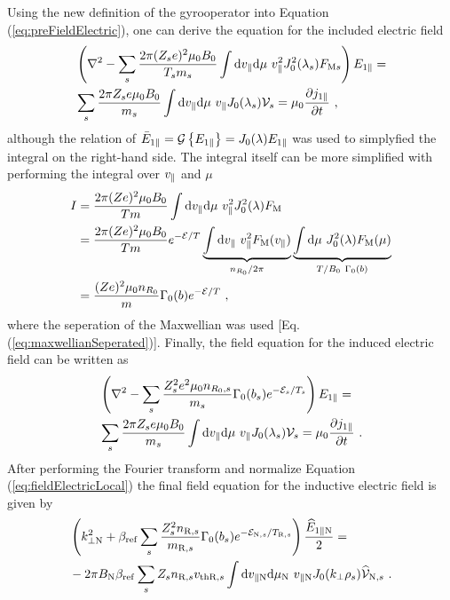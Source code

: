 Using the new definition of the gyrooperator into Equation (\ref{eq:preFieldElectric}), one can derive the equation for the included electric field 
\begin{gather}
    \begin{aligned}
        &\left(\nabla^2 - \sum_s \frac{2\pi (Z_se)^2 \mu_0 B_0}{T_sm_s}  \int \mathrm{d}v_\parallel\mathrm{d}\mu ~ v_\parallel^2 J_0^2(\lambda_s) F_{\mathrm{M}s} \right) E_{1\parallel} = \\
	    &\sum_s \frac{2\pi Z_se \mu_0 B_0}{m_s}  \int \mathrm{d}v_\parallel\mathrm{d}\mu ~ v_\parallel J_0(\lambda_s) \mathcal{V}_s = \mu_0 \frac{\partial j_{1\parallel}}{\partial t}~,
    \end{aligned}
	\label{eq:prefieldElectricLocal}
\end{gather}
although the relation of $\bar{E}_{1\parallel} = \mathcal{G} \left\{E_{1\parallel}\right\} = J_0(\lambda) E_{1\parallel}$ was used to simplyfied the integral on the right-hand side. The integral itself can be more simplified with performing the integral over $v_\parallel$ and $\mu$
\begin{gather}
	\begin{aligned}
		I &= \frac{2\pi (Ze)^2 \mu_0 B_0}{Tm}  \int \mathrm{d}v_\parallel\mathrm{d}\mu ~ v_\parallel^2 J_0^2(\lambda) F_\mathrm{M} \\
		  &= \frac{2\pi (Ze)^2 \mu_0 B_0}{Tm} e^{-\mathcal{E}/T} \underbrace{\int \mathrm{d}v_\parallel ~ v_\parallel^2 F_\mathrm{M}(v_\parallel)}_{n_{R_0}/2\pi} \underbrace{\int \mathrm{d}\mu ~ J_0^2(\lambda) F_\mathrm{M}(\mu)}_{T/B_0~\Gamma_0(b)} \\
		  &= \frac{(Ze)^2 \mu_0 n_{R_0}}{m} \Gamma_0(b) e^{-\mathcal{E}/T} ~,
	\end{aligned}
\end{gather}
where the seperation of the Maxwellian was used [Eq. (\ref{eq:maxwellianSeperated})]. Finally, the field equation for the induced electric field can be written as
\begin{gather}
    \begin{aligned}
        &\left(\nabla^2 - \sum_s \frac{Z_s^2e^2 \mu_0 n_{R_0,s}}{m_s} \Gamma_0(b_s) e^{-\mathcal{E}_s/T_s} \right) E_{1\parallel} = \\
	    &\sum_s \frac{2\pi Z_se \mu_0 B_0}{m_s}  \int \mathrm{d}v_\parallel\mathrm{d}\mu ~ v_\parallel J_0(\lambda_s) \mathcal{V}_s = \mu_0 \frac{\partial j_{1\parallel}}{\partial t}~.
    \end{aligned}
	\label{eq:fieldElectricLocal}
\end{gather}
After performing the Fourier transform and normalize Equation (\ref{eq:fieldElectricLocal}) the final field equation for the inductive electric field is given by
\begin{gather}
    \begin{aligned}
        &\left(k_{\perp \mathrm{N}}^2 + \beta_\mathrm{ref} \sum_s \frac{Z^2_sn_{\mathrm{R},s}}{m_{\mathrm{R},s}} \Gamma_0(b_s) e^{-\mathcal{E}_{\mathrm{N},s}/T_{\mathrm{R},s}} \right) \frac{\widehat{E}_{1\parallel \mathrm{N}}}{2} = \\
        &- 2\pi B_\mathrm{N} \beta_\mathrm{ref} \sum_s Z_s n_{\mathrm{R},s} v_{\mathrm{th}\mathrm{R},s} \int \mathrm{d}v_{\parallel \mathrm{N}} \mathrm{d}\mu_\mathrm{N} ~ v_{\parallel \mathrm{N}} J_0(k_\perp \rho_s) \widehat{\mathcal{V}}_{\mathrm{N},s} ~.
    \end{aligned}
    \label{eq:fieldElectricLocalNorm}
\end{gather}